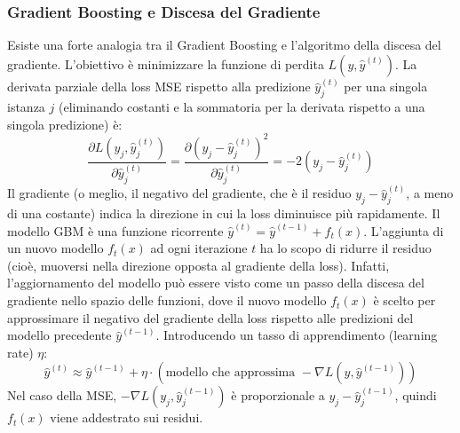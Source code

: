 \documentclass{article}
\begin{document}
\subsubsection{Gradient Boosting e Discesa del Gradiente}
Esiste una forte analogia tra il Gradient Boosting e l'algoritmo della discesa del gradiente. L'obiettivo è minimizzare la funzione di perdita $L(y, \hat{y}^{(t)})$. La derivata parziale della loss MSE rispetto alla predizione $\hat{y}_j^{(t)}$ per una singola istanza $j$ (eliminando costanti e la sommatoria per la derivata rispetto a una singola predizione) è:
$$ \frac{\partial L(y_j, \hat{y}_j^{(t)})}{\partial \hat{y}_j^{(t)}} = \frac{\partial (y_j - \hat{y}_j^{(t)})^2}{\partial \hat{y}_j^{(t)}} = -2(y_j - \hat{y}_j^{(t)}) $$
Il gradiente (o meglio, il negativo del gradiente, che è il residuo $y_j - \hat{y}_j^{(t)}$, a meno di una costante) indica la direzione in cui la loss diminuisce più rapidamente.
Il modello GBM è una funzione ricorrente $\hat{y}^{(t)} = \hat{y}^{(t-1)} + f_t(x)$. L'aggiunta di un nuovo modello $f_t(x)$ ad ogni iterazione $t$ ha lo scopo di ridurre il residuo (cioè, muoversi nella direzione opposta al gradiente della loss). Infatti, l'aggiornamento del modello può essere visto come un passo della discesa del gradiente nello spazio delle funzioni, dove il nuovo modello $f_t(x)$ è scelto per approssimare il negativo del gradiente della loss rispetto alle predizioni del modello precedente $\hat{y}^{(t-1)}$. Introducendo un tasso di apprendimento (learning rate) $\eta$:
$$ \hat{y}^{(t)} \approx \hat{y}^{(t-1)} + \eta \cdot (\text{modello che approssima } - \nabla L(y, \hat{y}^{(t-1)})) $$
Nel caso della MSE, $- \nabla L(y_j, \hat{y}_j^{(t-1)})$ è proporzionale a $y_j - \hat{y}_j^{(t-1)}$, quindi $f_t(x)$ viene addestrato sui residui.
\end{document}
